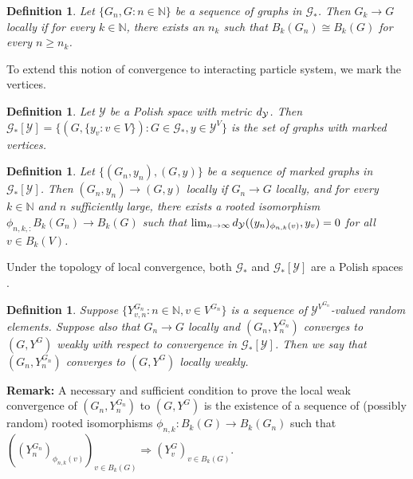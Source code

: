 \documentclass[12pt]{article}
\newcommand{\mb}{\mathbb}
\newcommand{\mc}{\mathcal}
\newcommand{\ra}{\rightarrow}
\newcommand{\remark}{\textbf{Remark: }}
\newcommand{\xg}{y}									%
\newcommand{\met}[2]{
\ifstrempty{#2}{
	d_{#1}}{
	d_{#1,#2}}}										%
\newcommand{\vind}[1]{_{#1}}						%
\newcommand{\gind}[1]{^{#1}}						%
\newcommand{\Gs}{\mc{G}_\ast}						%
\newcommand{\trnc}[1]{B_{#1}}						%
\newcommand{\spce}{\mc{Y}}							%
\renewcommand{\sp}[1]{[#1]}							%
\newcommand{\dit}[2]{_{#1,#2}}						%
\newcommand{\vindit}[2]{_{#1,#2}}					%
\newcommand{\Xg}{Y}									%
\renewcommand{\it}[1]{_{#1}}						%
\newtheorem{defn}[thms]{Definition}
\begin{document}
\begin{defn}
Let \(\{G\it{n},G:n\in\mb{N}\}\) be a sequence of graphs in \(\Gs\). Then \(G\it{k} \ra G\) locally if for every \(k \in \mb{N}\), there exists an \(n\it{k}\) such that \(\trnc{k}(G\it{n}) \cong \trnc{k}(G)\) for every \(n \geq n_k\).
\label{lwc::lc}
\end{defn}

To extend this notion of convergence to interacting particle system, we mark the vertices.

\begin{defn}
Let \(\spce\) be a Polish space with metric \(\met{\spce}{}\). Then \(\Gs\sp{\spce} = \{(G,\{\xg\vind{v}:v \in V\}): G \in \Gs, \xg\in \spce^V\}\) is the set of graphs with marked vertices.
\label{lwc::marked}
\end{defn}

\begin{defn}
Let \(\{(G\it{n},\xg\it{n}),(G,\xg)\}\) be a sequence of marked graphs in \(\Gs\sp{\spce}\). Then \((G\it{n},\xg\it{n}) \ra (G,\xg)\) locally if \(G\it{n} \ra G\) locally, and for every \(k \in \mb{N}\) and \(n\) sufficiently large, there exists a rooted isomorphism \(\phi\dit{n,k}:\trnc{k}(G\it{n}) \ra \trnc{k}(G)\) such that \(\lim_{n\ra\infty} \met{\spce}{}((\xg\it{n})\vind{\phi\dit{n}{k}(v)},\xg\vind{v}) = 0\) for all \(v \in \trnc{k}(V)\).
\label{lwc::mlc}
\end{defn}

Under the topology of local convergence, both \(\Gs\) and \(\Gs\sp{\spce}\) are a Polish spaces \cite[Lemmas A.2, A.3, and A.5]{LacRamWu19}.

\begin{defn}
Suppose \(\{\Xg\gind{G\it{n}}\vindit{v}{n}:n\in\mb{N},v \in V\gind{G\it{n}}\}\) is a sequence of \(\spce^{V\gind{G\it{n}}}\)-valued random elements. Suppose also that \(G\it{n} \ra G\) locally and \((G\it{n},\Xg\gind{G\it{n}}\it{n})\) converges to \((G,\Xg\gind{G})\) weakly with respect to convergence in \(\Gs\sp{\spce}\). Then we say that \((G\it{n},\Xg\gind{G\it{n}}\it{n})\) converges to \((G,\Xg\gind{G})\) locally weakly.
\label{lwc::lwc}
\end{defn}

\remark A necessary and sufficient condition to prove the local weak convergence of \((G\it{n},\Xg\gind{G\it{n}}\it{n})\) to \((G,\Xg\gind{G})\) is the existence of a sequence of (possibly random) rooted isomorphisms \(\phi_{n,k}: \trnc{k}(G) \ra \trnc{k}(G\it{n})\) such that \(\left((\Xg\gind{G\it{n}}\it{n})\vind{\phi_{n,k}(v)}\right)_{v\in \trnc{k}(G)} \Rightarrow \left(\Xg\gind{G}\vind{v}\right)_{v \in\trnc{k}(G)}\).
\end{document}
